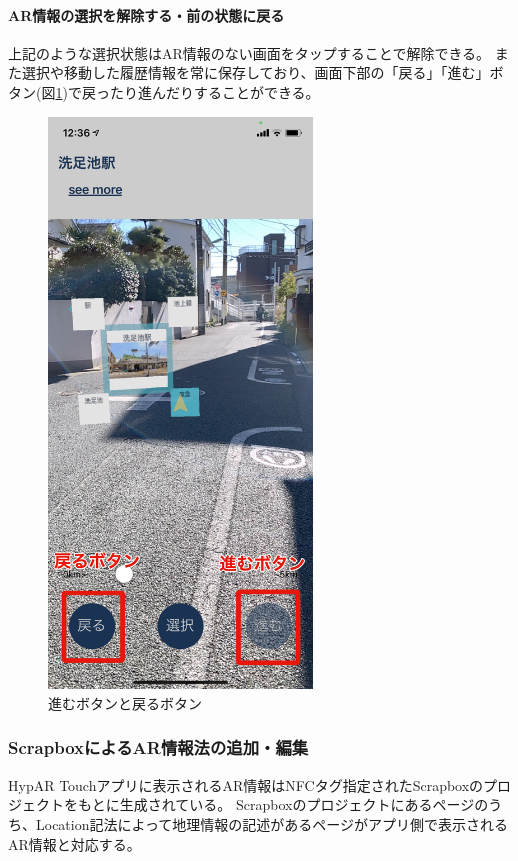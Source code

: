 \paragraph*{AR情報の選択を解除する・前の状態に戻る}
上記のような選択状態はAR情報のない画面をタップすることで解除できる。
また選択や移動した履歴情報を常に保存しており、画面下部の「戻る」「進む」ボタン(図\ref{fig:hypar_touch_history_button})で戻ったり進んだりすることができる。

\begin{figure}[h]
  \centering
  \includegraphics[width=70mm]{images/hypar_touch_history_button.png}
  \caption{進むボタンと戻るボタン} \label{fig:hypar_touch_history_button}
\end{figure}

\subsubsection{ScrapboxによるAR情報法の追加・編集}
HypAR Touchアプリに表示されるAR情報はNFCタグ指定されたScrapboxのプロジェクトをもとに生成されている。
Scrapboxのプロジェクトにあるページのうち、Location記法によって地理情報の記述があるページがアプリ側で表示されるAR情報と対応する。

